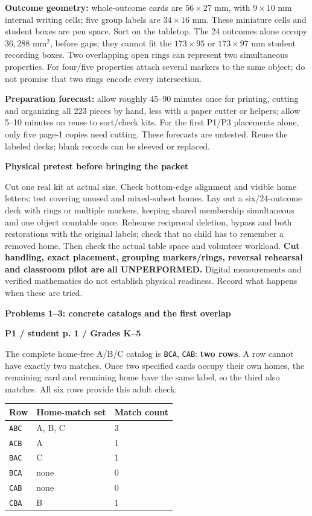 \documentclass[11pt]{article}
\newcommand{\heading}[1]{\par\textbf{\large #1}\par}
\newcommand{\subhead}[1]{\par\textbf{#1}\par}
\newcommand{\row}[1]{\texttt{#1}}
\newcommand{\guidepage}{\newpage}
\begin{document}
\textbf{Outcome geometry:} whole-outcome cards are $56\times27$ mm, with $9\times10$ mm internal writing cells; five group labels are $34\times16$ mm. These miniature cells and student boxes are pen space. Sort on the tabletop. The 24 outcomes alone occupy $36{,}288$ mm$^2$, before gaps; they cannot fit the $173\times95$ or $173\times97$ mm student recording boxes. Two overlapping open rings can represent two simultaneous properties. For four/five properties attach several markers to the same object; do not promise that two rings encode every intersection.

\textbf{Preparation forecast:} allow roughly 45--90 minutes once for printing, cutting and organizing all 223 pieces by hand, less with a paper cutter or helpers; allow 5--10 minutes on reuse to sort/check kits. For the first P1/P3 placements alone, only five page-1 copies need cutting. These forecasts are untested. Reuse the labeled decks; blank records can be sleeved or replaced.

\subhead{Physical pretest before bringing the packet}
Cut one real kit at actual size. Check bottom-edge alignment and visible home letters; test covering unused and mixed-subset homes. Lay out a six/24-outcome deck with rings or multiple markers, keeping shared membership simultaneous and one object countable once. Rehearse reciprocal deletion, bypass and both restorations with the original labels; check that no child has to remember a removed home. Then check the actual table space and volunteer workload. \textbf{Cut handling, exact placement, grouping markers/rings, reversal rehearsal and classroom pilot are all UNPERFORMED.} Digital measurements and verified mathematics do not establish physical readiness. Record what happens when these are tried.

\guidepage
\heading{Problems 1--3: concrete catalogs and the first overlap}

\subhead{P1 / student p. 1 / Grades K--5}
The complete home-free A/B/C catalog is \row{BCA}, \row{CAB}: \textbf{two rows}. A row cannot have exactly two matches. Once two specified cards occupy their own homes, the remaining card and remaining home have the same label, so the third also matches. All six rows provide this adult check:

\begin{center}\begin{tabular}{@{}lll@{}}\toprule
Row & Home-match set & Match count\\\midrule
\row{ABC}&A, B, C&3\\
\row{ACB}&A&1\\
\row{BAC}&C&1\\
\row{BCA}&none&0\\
\row{CAB}&none&0\\
\row{CBA}&B&1\\\bottomrule
\end{tabular}\end{center}
\end{document}
